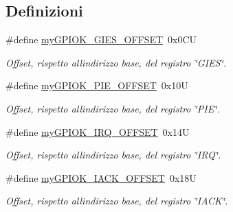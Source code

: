 \subsection*{Definizioni}
\begin{DoxyCompactItemize}
\item 
\#define \hyperlink{group__my_g_p_i_o_k__t_ga0da2526ca3cd1a94ebcecf96778ea2e5}{my\+G\+P\+I\+O\+K\+\_\+\+G\+I\+E\+S\+\_\+\+O\+F\+F\+S\+ET}~0x0\+CU
\begin{DoxyCompactList}\small\item\em Offset, rispetto all\textquotesingle{}indirizzo base, del registro \char`\"{}\+G\+I\+E\+S\char`\"{}. \end{DoxyCompactList}\item 
\#define \hyperlink{group__my_g_p_i_o_k__t_ga2ed7646e6f910f5803477e51b7fe26e3}{my\+G\+P\+I\+O\+K\+\_\+\+P\+I\+E\+\_\+\+O\+F\+F\+S\+ET}~0x10U
\begin{DoxyCompactList}\small\item\em Offset, rispetto all\textquotesingle{}indirizzo base, del registro \char`\"{}\+P\+I\+E\char`\"{}. \end{DoxyCompactList}\item 
\#define \hyperlink{group__my_g_p_i_o_k__t_ga37ee502d1ba364dfde9261c4f7a537a6}{my\+G\+P\+I\+O\+K\+\_\+\+I\+R\+Q\+\_\+\+O\+F\+F\+S\+ET}~0x14U
\begin{DoxyCompactList}\small\item\em Offset, rispetto all\textquotesingle{}indirizzo base, del registro \char`\"{}\+I\+R\+Q\char`\"{}. \end{DoxyCompactList}\item 
\#define \hyperlink{group__my_g_p_i_o_k__t_gac72408c288009c213c0231973b3fe761}{my\+G\+P\+I\+O\+K\+\_\+\+I\+A\+C\+K\+\_\+\+O\+F\+F\+S\+ET}~0x18U
\begin{DoxyCompactList}\small\item\em Offset, rispetto all\textquotesingle{}indirizzo base, del registro \char`\"{}\+I\+A\+C\+K\char`\"{}. \end{DoxyCompactList}\end{DoxyCompactItemize}
